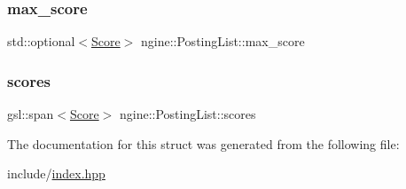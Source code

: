 \mbox{\label{structngine_1_1PostingList_a11449cec5e29b130a17a001d9b7c93e9}} 
\subsubsection{\texorpdfstring{max\+\_\+score}{max\_score}}
{\footnotesize\ttfamily std\+::optional$<$\hyperlink{structngine_1_1Score}{Score}$>$ ngine\+::\+Posting\+List\+::max\+\_\+score}

\mbox{\label{structngine_1_1PostingList_afbb6ea1aacb70cf1f63cc326ab152606}} 
\subsubsection{\texorpdfstring{scores}{scores}}
{\footnotesize\ttfamily gsl\+::span$<$\hyperlink{structngine_1_1Score}{Score}$>$ ngine\+::\+Posting\+List\+::scores}



The documentation for this struct was generated from the following file\+:\begin{DoxyCompactItemize}
\item 
include/\hyperlink{index_8hpp}{index.\+hpp}\end{DoxyCompactItemize}
